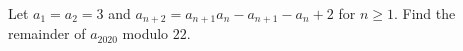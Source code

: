 Let $a_1=a_2=3$ and $a_{n+2}=a_{n+1}a_n-a_{n+1}-a_n+2$ for $n\ge1$. Find the remainder of $a_{2020}$ modulo $22$.
